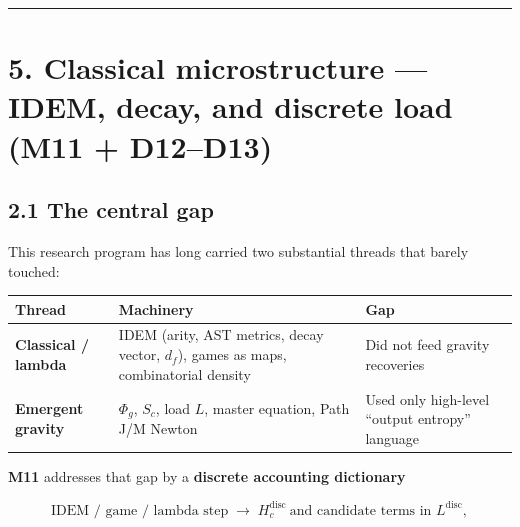 \documentclass[
  11pt,
]{article}
\newcounter{none} %
\begin{document}
\begin{center}\rule{0.5\linewidth}{0.5pt}\end{center}

\section{5. Classical microstructure --- IDEM, decay, and discrete load
(M11 +
D12--D13)}\label{classical-microstructure-idem-decay-and-discrete-load-m11-d12d13}

\subsection{2.1 The central gap}\label{the-central-gap}

This research program has long carried two substantial threads that
barely touched:

{\def\LTcaptype{none} %
\begin{longtable}[]{@{}
  >{\raggedright\arraybackslash}p{}
  >{\raggedright\arraybackslash}p{}
  >{\raggedright\arraybackslash}p{}@{}}
\toprule\noalign{}
\begin{minipage}[b]{\linewidth}\raggedright
Thread
\end{minipage} & \begin{minipage}[b]{\linewidth}\raggedright
Machinery
\end{minipage} & \begin{minipage}[b]{\linewidth}\raggedright
Gap
\end{minipage} \\
\midrule\noalign{}
\endhead
\bottomrule\noalign{}
\endlastfoot
\textbf{Classical / lambda} & IDEM (arity, AST metrics, decay vector,
\(d_f\)), games as maps, combinatorial density & Did not feed gravity
recoveries \\
\textbf{Emergent gravity} & \(\Phi_g\), \(S_c\), load \(L\), master
equation, Path J/M Newton & Used only high-level ``output entropy''
language \\
\end{longtable}
}

\textbf{M11} addresses that gap by a \textbf{discrete accounting
dictionary}

\[
\text{IDEM / game / lambda step}\;\longrightarrow\; H_c^{\mathrm{disc}}\ \text{and candidate terms in }L^{\mathrm{disc}},
\]
\end{document}
